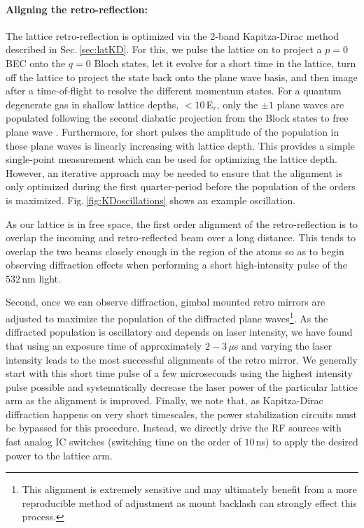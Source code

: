 \paragraph{Aligning the retro-reflection:}
The lattice retro-reflection is optimized via the 2-band Kapitza-Dirac method described in Sec.\,\ref{sec:latKD}.
For this, we pulse the lattice on to project a $p=0$ BEC onto the $q=0$ Bloch states, let it evolve for a short time in the lattice, turn off the lattice to project the state back onto the plane wave basis, and then image after a time-of-flight to resolve the different momentum states.
For a quantum degenerate gas in shallow lattice depths, $<10$\,E$_r$, only the $\pm1$ plane waves are populated following the second diabatic projection from the Block states to free plane wave \cite{Fallani2005,Denschlag2002}.
Furthermore, for short pulses the amplitude of the population in these plane waves is linearly increasing with lattice depth.
This provides a simple single-point measurement which can be used for optimizing the lattice depth.
However, an iterative approach may be needed to ensure that the alignment is only optimized during the first quarter-period before the population of the orders is maximized.
Fig.\,\ref{fig:KDoscillations} shows an example oscillation.

As our lattice is in free space, the first order alignment of the retro-reflection is to overlap the incoming and retro-reflected beam over a long distance.
This tends to overlap the two beams closely enough in the region of the atoms so as to begin observing diffraction effects when performing a short high-intensity pulse of the $532$\,nm light.

Second, once we can observe diffraction, gimbal mounted retro mirrors are adjusted to maximize the population of the diffracted plane waves\footnote{This alignment is extremely sensitive and may ultimately benefit from a more reproducible method of adjustment as mount backlash can strongly effect this process.}.
As the diffracted population is oscillatory and depends on laser intensity, we have found that using an exposure time of approximately $2 - 3$\,$\mu$s and varying the laser intensity leads to the most successful alignments of the retro mirror.
We generally start with this short time pulse of a few microseconds using the highest intensity pulse possible and systematically decrease the laser power of the particular lattice arm as the alignment is improved.
Finally, we note that, as Kapitza-Dirac diffraction happens on very short timescales, the power stabilization circuits must be bypassed for this procedure.
Instead, we directly drive the RF sources with fast analog IC switches (switching time on the order of $10$\,ns) to apply the desired power to the lattice arm.

